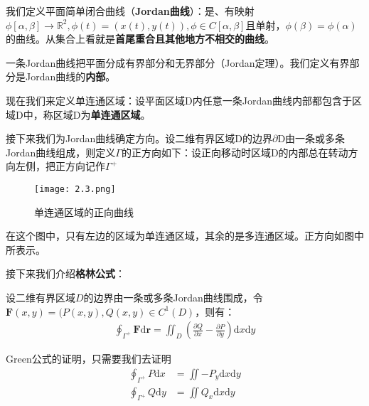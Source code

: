 \documentclass{ctexart}
\let\oldtextbf\textbf
\renewcommand{\textbf}[1]{\textcolor{brown!50!red}{\oldtextbf{#1}}}
\begin{document}
我们定义平面简单闭合曲线（\textbf{\color{brown!50!red}Jordan曲线}）：是、有映射$\phi[\alpha,\beta]\to \mathbb{R}^2,\phi(t)=(x(t),y(t)),\phi\in C[\alpha,\beta]$且单射，$\phi(\beta)=\phi(\alpha)$的曲线。从集合上看就是\textbf{\color{brown!50!red}首尾重合且其他地方不相交的曲线}。

一条Jordan曲线把平面分成有界部分和无界部分（Jordan定理）。我们定义有界部分是Jordan曲线的\textbf{\color{brown!50!red}内部}。

现在我们来定义单连通区域：设平面区域D内任意一条Jordan曲线内部都包含于区域D中，称区域D为\textbf{\color{brown!50!red}单连通区域}。

接下来我们为Jordan曲线确定方向。设二维有界区域D的边界$\partial$D由一条或多条Jordan曲线组成，则定义$\Gamma$的正方向如下：设正向移动时区域D的内部总在转动方向左侧，把正方向记作$\Gamma^+$
\begin{figure}[H]    
\centering     
\renewcommand{\figurename}{图}     
\renewcommand{\thefigure}{2.3}    
\begin{myimagebox}[width=0.7\textwidth] %
\texttt{[image: 2.3.png]} %
\end{myimagebox}     
\caption{\label{fig:2.3}单连通区域的正向曲线}   
\end{figure}

在这个图中，只有左边的区域为单连通区域，其余的是多连通区域。正方向如图中所表示。

接下来我们介绍\textbf{\color{brown!50!red}格林公式}：
\begin{tcolorbox}[
    colback=bac2,     %
    colframe=fra2,   %
    coltitle=white,             %
    coltext=tex2,
    title=Green格林公式,
    fonttitle=\bfseries,        %
arc=3mm,                     %
breakable
]
设二维有界区域$D$的边界由一条或多条Jordan曲线围成，令$\bm{F}(x,y)=(P(x,y),Q(x,y)\in C^1(D)$，则有：
\begin{align*}
\oint_{\Gamma^+}\bm{F}\mathrm{d}\bm{r}=\iint_D (\frac{\partial  Q}{\partial  x}-
\frac{\partial P}{\partial  y}  )\mathrm{d}x\mathrm{d}y\tag{2-9}  
\end{align*}
\end{tcolorbox}

Green公式的证明，只需要我们去证明
\begin{align*}
  \oint_{\Gamma^+}P\mathrm{d}x&=\iint -P_y\mathrm{d}x\mathrm{d}y\tag{2-10}\\
  \oint_{\Gamma^+}Q\mathrm{d}y&=\iint Q_x\mathrm{d}x\mathrm{d}y  
\end{align*}
\end{document}
